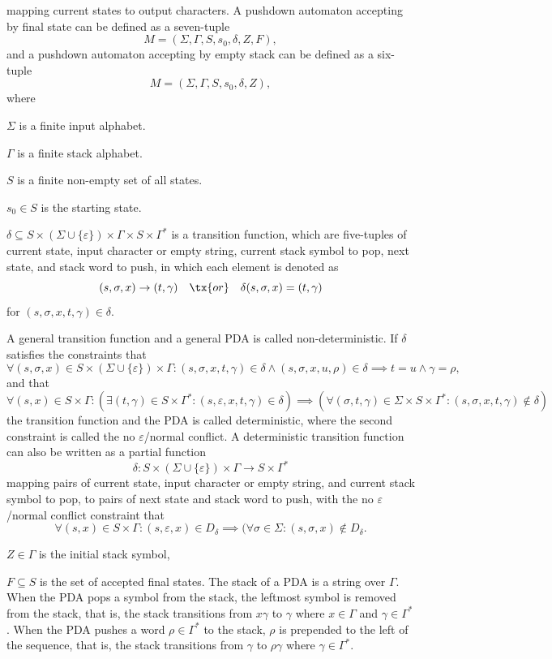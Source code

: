 \documentclass[a4paper,12pt]{article}
\begin{document}
mapping current states to output characters.
\eit
{}
A pushdown automaton accepting by final state can be defined as a seven-tuple
\[M=(\Sigma,\Gamma,S,s_0,\delta,Z,F),\]
and a pushdown automaton accepting by empty stack can be defined as a six-tuple
\[M=(\Sigma,\Gamma,S,s_0,\delta,Z),\]
where
\bit
\item $\Sigma$ is a finite input alphabet.
\item $\Gamma$ is a finite stack alphabet.
\item $S$ is a finite non-empty set of all states.
\item $s_0\in S$ is the starting state.
\item $\delta\subseteq S\times(\Sigma\cup\{\varepsilon\})\times\Gamma\times S\times\Gamma^*$ is a transition function, which are five-tuples of current state, input character or empty string, current stack symbol to pop, next state, and stack word to push, in which each element is denoted as
\[(s,\sigma,x)\to (t,\gamma)\quad\tx{or}\quad\delta(s,\sigma,x)=(t,\gamma)\]
for $(s,\sigma,x,t,\gamma)\in\delta$.

A general transition function and a general PDA is called non-deterministic. If $\delta$ satisfies the constraints that
\[\forall (s,\sigma,x)\in S\times(\Sigma\cup\{\varepsilon\})\times\Gamma\colon(s,\sigma,x,t,\gamma)\in\delta\land(s,\sigma,x,u,\rho)\in\delta\implies t=u\land\gamma=\rho,\]
and that
\[\forall (s,x)\in S\times\Gamma\colon(\exists(t,\gamma)\in S\times\Gamma^*\colon(s,\varepsilon,x,t,\gamma)\in\delta)\implies(\forall(\sigma,t,\gamma)\in\Sigma\times S\times\Gamma^*\colon(s,\sigma,x,t,\gamma)\notin\delta)\]
the transition function and the PDA is called deterministic, where the second constraint is called the no $\varepsilon$/normal conflict. A deterministic transition function can also be written as a partial function
\[\delta\colon S\times(\Sigma\cup\{\varepsilon\})\times\Gamma\to S\times\Gamma^*\]
mapping pairs of current state, input character or empty string, and current stack symbol to pop, to pairs of next state and stack word to push, with the no $\varepsilon$/normal conflict constraint that
\[\forall (s,x)\in S\times\Gamma\colon(s,\varepsilon,x)\in D_{\delta}\implies(\forall\sigma\in\Sigma\colon(s,\sigma,x)\notin D_{\delta}.\]
\item $Z\in\Gamma$ is the initial stack symbol, 
\item $F\subseteq S$ is the set of accepted final states.
\eit
The stack of a PDA is a string over $\Gamma$. When the PDA pops a symbol from the stack, the leftmost symbol is removed from the stack, that is, the stack transitions from $x\gamma$ to $\gamma$ where $x\in\Gamma$ and $\gamma\in\Gamma^*$. When the PDA pushes a word $\rho\in\Gamma^*$ to the stack, $\rho$ is prepended to the left of the sequence, that is, the stack transitions from $\gamma$ to $\rho\gamma$ where $\gamma\in\Gamma^*$.
\end{document}
